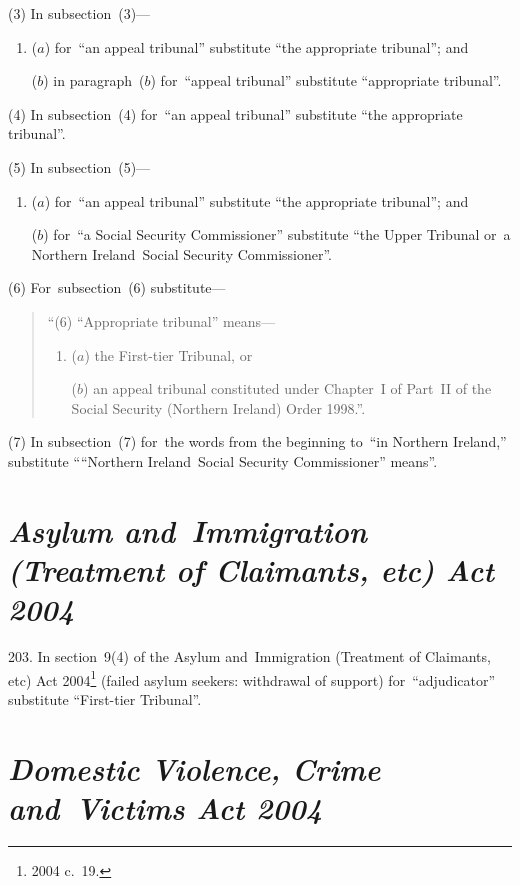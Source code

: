 \documentclass[12pt,a4paper]{article}
\begin{document}
(3) In subsection~(3)—
\begin{enumerate}\item[]
($a$) for~“an appeal tribunal” substitute “the appropriate tribunal”; and

($b$) in paragraph~($b$)  for~“appeal tribunal” substitute “appropriate tribunal”.
\end{enumerate}

(4) In subsection~(4) for~“an appeal tribunal” substitute “the appropriate tribunal”.

(5) In subsection~(5)—
\begin{enumerate}\item[]
($a$) for~“an appeal tribunal” substitute “the appropriate tribunal”; and

($b$) for~“a Social Security Commissioner” substitute “the Upper Tribunal or~a Northern Ireland~Social Security Commissioner”.
\end{enumerate}

(6) For~subsection~(6) substitute—
\begin{quotation}
“(6) “Appropriate tribunal” means---
\begin{enumerate}\item[]
($a$) the First-tier Tribunal, or

($b$) an appeal tribunal constituted under Chapter~I of Part~II of the Social Security (Northern Ireland) Order 1998.”.
\end{enumerate}
\end{quotation}

(7) In subsection~(7) for~the words from the beginning to~“in Northern Ireland,” substitute ““Northern Ireland~Social Security Commissioner” means”.

\section*{\itshape\sloppy{} Asylum and~Immigration (Treatment of Claimants, etc) Act 2004}

203.  In section~9(4) of the Asylum and~Immigration (Treatment of Claimants, etc) Act 2004\footnote{2004 c.~19.} (failed asylum seekers: withdrawal of support) for~“adjudicator” substitute “First-tier Tribunal”.

\section*{\itshape Domestic Violence, Crime and~Victims Act 2004}
\end{document}
